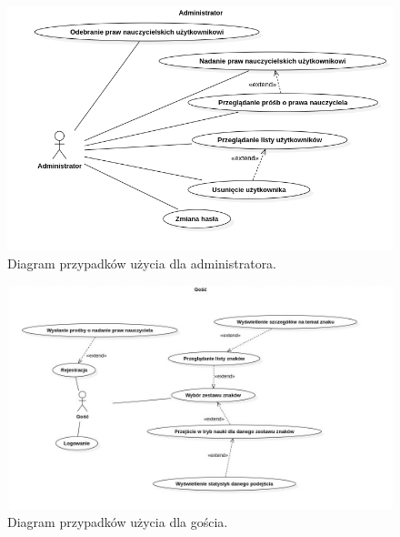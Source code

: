 \documentclass[a4paper,twoside,12pt]{book}
\begin{document}
\begin{figure}[]
\centering
\includegraphics[width=\textwidth]{Admin}
\caption{Diagram przypadków użycia dla administratora.}
\label{fig:admin}
\end{figure}
\begin{figure}[]
\centering
\includegraphics[width=\textwidth]{Gość}
\caption{Diagram przypadków użycia dla gościa.}
\label{fig:guest}
\end{figure}


\end{document}
